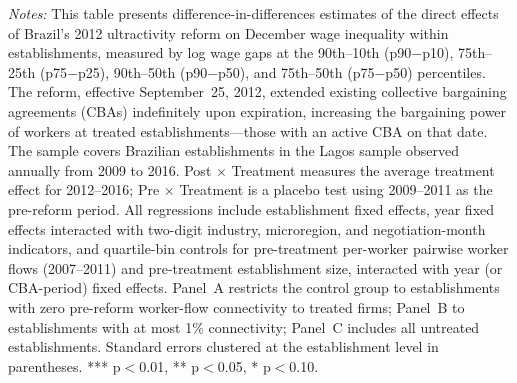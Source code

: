 \documentclass[12pt,letterpaper]{article}
\begin{document}
\begin{table}[]
\begin{threeparttable}
\begin{tablenotes}
\item \textit{Notes:} This table presents difference-in-differences estimates of the direct effects of Brazil's 2012 ultractivity reform on December wage inequality within establishments, measured by log wage gaps at the 90th--10th (p90$-$p10), 75th--25th (p75$-$p25), 90th--50th (p90$-$p50), and 75th--50th (p75$-$p50) percentiles. The reform, effective September~25, 2012, extended existing collective bargaining agreements (CBAs) indefinitely upon expiration, increasing the bargaining power of workers at treated establishments---those with an active CBA on that date. The sample covers Brazilian establishments in the Lagos sample observed annually from 2009 to 2016. Post $\times$ Treatment measures the average treatment effect for 2012--2016; Pre $\times$ Treatment is a placebo test using 2009--2011 as the pre-reform period. All regressions include establishment fixed effects, year fixed effects interacted with two-digit industry, microregion, and negotiation-month indicators, and quartile-bin controls for pre-treatment per-worker pairwise worker flows (2007--2011) and pre-treatment establishment size, interacted with year (or CBA-period) fixed effects. Panel~A restricts the control group to establishments with zero pre-reform worker-flow connectivity to treated firms; Panel~B to establishments with at most 1\% connectivity; Panel~C includes all untreated establishments. Standard errors clustered at the establishment level in parentheses. *** p$<$0.01, ** p$<$0.05, * p$<$0.10.
\end{tablenotes}
\end{threeparttable}
\end{table}

\clearpage
\end{document}
